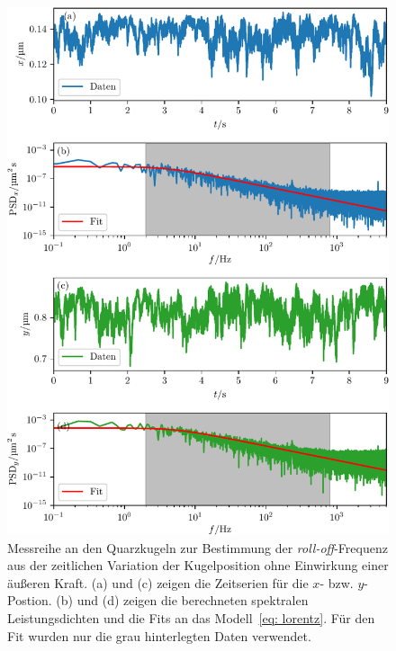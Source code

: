 \begin{figure}
  \centering
  \includegraphics[scale = 1]{../analysis/data/i_quarz/70mA/results/without_force_70mA.pdf}
  \caption{Messreihe an den Quarzkugeln zur Bestimmung der \emph{roll-off}-Frequenz aus der zeitlichen Variation der Kugelposition ohne Einwirkung einer äußeren Kraft.
  (a) und (c) zeigen die Zeitserien für die $x$- bzw. $y$- Postion. (b) und (d) zeigen die berechneten spektralen Leistungsdichten und die Fits an das
  Modell~\eqref{eq: lorentz}. Für den Fit wurden nur die grau hinterlegten Daten verwendet.}
  \label{fig: quarz_without_force}
\end{figure}
